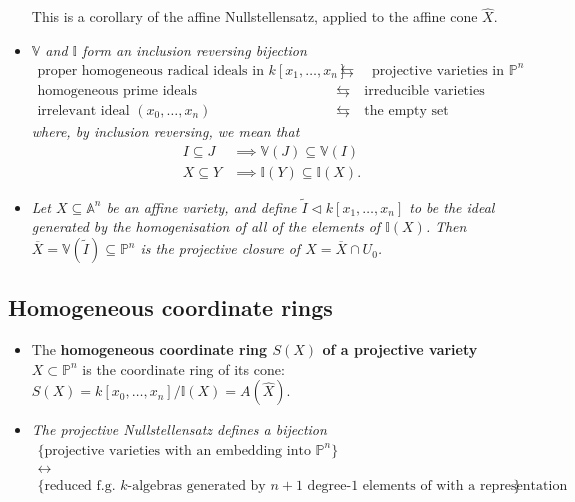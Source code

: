 \documentclass[10pt]{article}
\newcommand{\van}{\mathbb{V}}
\newcommand{\ide}{\mathbb{I}}
\newcommand{\aff}{\mathbb{A}}
\newcommand{\kon}{{k[x_1,\ldots,x_n]}}
\newcommand{\kzn}{{k[x_0,\ldots,x_n]}}
\newcommand{\pee}{\mathbb{P}}
\begin{document}
\begin{itemize}
                    This is a corollary of the affine Nullstellensatz, applied to the affine cone $\widehat{X}$.
                \item \emph{$\van$ and $\ide$ form an inclusion reversing bijection}
                    \begin{align*}
                        \text{proper homogeneous radical ideals in }\kon\quad&\leftrightarrows\quad\text{projective varieties in }\pee^n\\
                        \text{homogeneous prime ideals} \quad&\leftrightarrows\quad \text{irreducible varieties}\\
                        \text{irrelevant ideal }(x_0,\ldots,x_n) \quad&\leftrightarrows\quad \text{the empty set}
                    \end{align*}
                    \emph{where, by inclusion reversing, we mean that}
                    \begin{align*}
                        I\subseteq J&\implies\van(J)\subseteq\van(I)\\
                        X\subseteq Y&\implies\ide(Y)\subseteq\ide(X).
                    \end{align*}
                \item \emph{Let $X\subseteq\aff^n$ be an affine variety, and define $\tilde{I}\triangleleft\kon$ to be the ideal generated by the homogenisation of \emph{all of the} elements of $\ide(X)$.}
                    \emph{Then $\overline{X}=\van(\tilde{I})\subseteq\pee^n$ is the projective closure of $X=\overline{X}\cap U_0$.}

            \end{itemize}

        \subsection{Homogeneous coordinate rings}

            \begin{itemize}
                \item The \textbf{homogeneous coordinate ring $S(X)$ of a projective variety} $X\subset\pee^n$ is the coordinate ring of its cone: $S(X)=\kzn/\ide(X)=A(\widehat{X})$.
                \item \emph{The projective Nullstellensatz defines a bijection}
                    \begin{gather*}
                        \{\text{projective varieties with an embedding into $\pee^n$}\}\\
                        \leftrightarrow\\
                        \{\text{reduced f.g. $k$-algebras generated by $n+1$ degree-$1$ elements of with a representation}\}
                    \end{gather*}
            \end{itemize}
\end{document}
